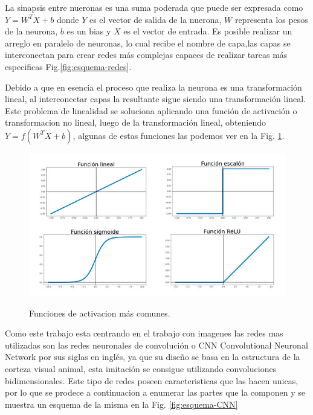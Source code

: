 La sinapsis entre nueronas es una suma poderada que puede ser expresada como $Y =W^T\dot X + b$ donde $Y$ es el vector de salida de la nuerona,
 $W$ representa los pesos de la neurona, $b$ es un bias y $X$ es el vector de entrada.
Es posible realizar un arreglo en paralelo de neuronas, lo cual recibe el nombre de capa,las capas se interconectan para crear redes 
más complejas capaces de realizar tareas más especificas Fig.\ref*{fig:esquema-redes}.

Debido a que en esencia el proceso que realiza la neurona es una transformación lineal, al interconectar capas la resultante sigue siendo 
una transformación lineal. Este problema de linealidad se soluciona aplicando una función de activación o transformacion no lineal,
luego de la transformación lineal, obteniendo $Y= f(W^T \dot X + b)$, algunas de estas funciones las podemos ver en la 
Fig. \ref*{fig:funciones-activacion}.
\begin{figure}
    \centering
    \includegraphics[width=1\textwidth]{imgs/Funciones-de-activacion.jpg}
    \label{fig:funciones-activacion}
    \caption{Funciones de activacion más comunes.}
\end{figure}
Como este trabajo esta centrando en el trabajo con imagenes las redes mas utilizadas son las redes neuronales de convolución o 
CNN Convolutional Neuronal Network por sus siglas en inglés, ya que su diseño se basa en la estructura de la corteza visual animal, esta 
imitación se consigue utilizando convoluciones bidimensionales. Este tipo de redes poseen caracteristicas que las hacen unicas, por lo que 
se prodece a continuacion a enumerar las partes que la componen y se muestra un esquema de la misma en la Fig. \ref*{fig:esquema-CNN}
